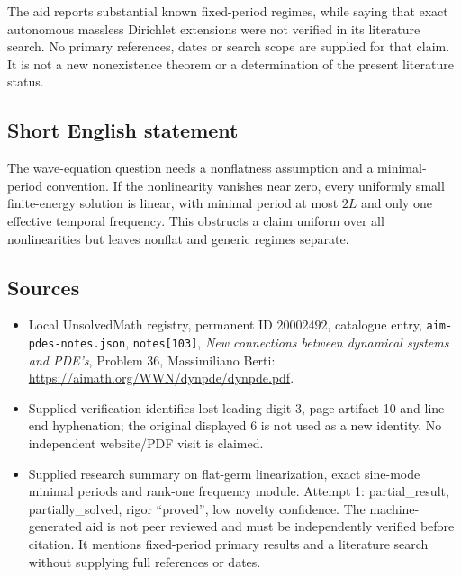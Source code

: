 \documentclass[11pt]{article}
\begin{document}
The aid reports substantial known fixed-period regimes, while saying that exact autonomous massless Dirichlet extensions were not verified in its literature search. No primary references, dates or search scope are supplied for that claim. It is not a new nonexistence theorem or a determination of the present literature status.
\subsection{Short English statement}
The wave-equation question needs a nonflatness assumption and a minimal-period convention. If the nonlinearity vanishes near zero, every uniformly small finite-energy solution is linear, with minimal period at most \(2L\) and only one effective temporal frequency. This obstructs a claim uniform over all nonlinearities but leaves nonflat and generic regimes separate.
\subsection{Sources}
\begin{itemize}
\item Local UnsolvedMath registry, permanent ID \(20002492\), catalogue entry, \texttt{aim-pdes-notes.json}, \texttt{notes[103]}, \emph{New connections between dynamical systems and PDE's}, Problem 36, Massimiliano Berti: \url{https://aimath.org/WWN/dynpde/dynpde.pdf}.
\item Supplied verification identifies lost leading digit 3, page artifact 10 and line-end hyphenation; the original displayed 6 is not used as a new identity. No independent website/PDF visit is claimed.
\item Supplied research summary on flat-germ linearization, exact sine-mode minimal periods and rank-one frequency module. Attempt 1: partial\_result, partially\_solved, rigor ``proved'', low novelty confidence. The machine-generated aid is not peer reviewed and must be independently verified before citation. It mentions fixed-period primary results and a literature search without supplying full references or dates.
\end{itemize}
\end{document}
